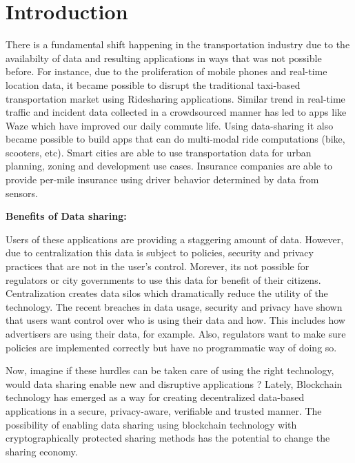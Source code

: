 \section{Introduction}\label{sec:intro}

There is a fundamental shift happening in the transportation industry due to the availabilty of data and resulting
applications in ways that was not possible before. For instance, due to the proliferation of mobile phones and real-time
location data, it became possible to disrupt the traditional taxi-based transportation market using Ridesharing
applications. Similar trend in real-time traffic and incident data collected in a crowdsourced manner has led to apps
like Waze which have improved our daily commute life. Using data-sharing it also became possible to build apps that can
do multi-modal ride computations (bike, scooters, etc). Smart cities are able to use transportation data for
urban planning, zoning and development use cases. Insurance companies are able to provide per-mile insurance using
driver behavior determined by data from sensors.

\noindent
{\bf \textsf Benefits of Data sharing:}


Users of these applications are providing a staggering amount of data. However, due to centralization this data is
subject to policies, security and privacy practices that are not in the user's control. Morever, its not possible for
regulators or city governments to use this data for benefit of their citizens. Centralization creates data silos which
dramatically reduce the utility of the technology. The recent breaches in data usage, security and privacy have shown
that users want control over who is using their data and how. This includes how advertisers are using their data, for
example. Also, regulators want to make sure policies are implemented correctly but have no programmatic way of doing so.

Now, imagine if these hurdles can be taken care of using the right technology, would data sharing enable new and
disruptive applications ? Lately, Blockchain technology has emerged as a way for creating decentralized data-based
applications in a secure, privacy-aware, verifiable and trusted manner. The possibility of enabling data sharing using
blockchain technology with cryptographically protected sharing methods has the potential to change the sharing economy.

